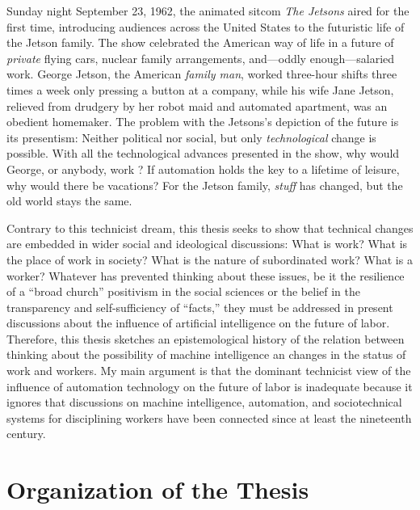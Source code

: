 \documentclass[version=last,draft=false,paper=A4,portrait,twoside=true,twocolumn=false,headinclude=false,footinclude=false,fontsize=12,BCOR=20mm,DIV=calc,pagesize=auto,titlepage=firstiscover,mpinclude=false,open=right,chapterprefix=true,numbers=autoendperiod,headsepline=false,headings=twolinechapter,parskip=false]{scrbook}
\begin{document}
Sunday night September 23, 1962, the animated sitcom \textit{The Jetsons}
aired for the first time, introducing audiences across the United States to
the futuristic life of the Jetson family. The show celebrated the American
way of life in a future of \textit{private} flying cars, nuclear family
arrangements, and---oddly enough---salaried work. George Jetson, the
American \textit{family man}, worked three-hour shifts three times a week
only pressing a button at a company, while his wife Jane Jetson, relieved
from drudgery by her robot maid and automated apartment, was an obedient
homemaker. The problem with the Jetsons's depiction of the future is its
presentism: Neither political nor social, but only \textit{technological}
change is possible. With all the technological advances presented in the
show, why would George, or anybody, work ? If automation holds the key to a
lifetime of leisure, why would there be vacations? For the Jetson family,
\textit{stuff} has changed, but the old world stays the same.

Contrary to this technicist dream, this thesis seeks to show that technical
changes are embedded in wider social and ideological discussions: What is
work? What is the place of work in society? What is the nature of
subordinated work? What is a worker? Whatever has prevented thinking about
these issues, be it the resilience of a ``broad church'' positivism in the
social sciences or the belief in the transparency and self-sufficiency of
``facts,'' they must be addressed in present discussions about the
influence of artificial intelligence on the future of labor. Therefore,
this thesis sketches an epistemological history of the relation between
thinking about the possibility of machine intelligence an changes in the
status of work and workers. My main argument is that the dominant
technicist view of the influence of automation technology on the future of
labor is inadequate because it ignores that discussions on machine
intelligence, automation, and sociotechnical systems for disciplining
workers have been connected since at least the nineteenth century.

\section{Organization of the Thesis}
\end{document}
